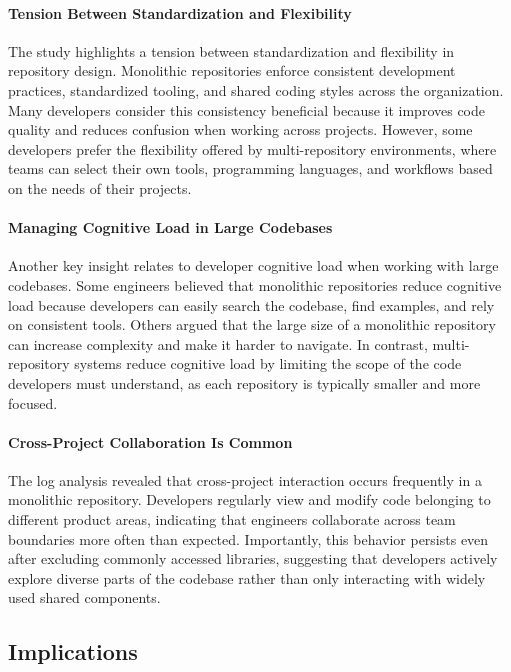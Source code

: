 \paragraph{Tension Between Standardization and Flexibility}

The study highlights a tension between standardization and flexibility in repository design. Monolithic repositories enforce consistent development practices, standardized tooling, and shared coding styles across the organization. Many developers consider this consistency beneficial because it improves code quality and reduces confusion when working across projects. However, some developers prefer the flexibility offered by multi-repository environments, where teams can select their own tools, programming languages, and workflows based on the needs of their projects.

\paragraph{Managing Cognitive Load in Large Codebases}

Another key insight relates to developer cognitive load when working with large codebases. Some engineers believed that monolithic repositories reduce cognitive load because developers can easily search the codebase, find examples, and rely on consistent tools. Others argued that the large size of a monolithic repository can increase complexity and make it harder to navigate. In contrast, multi-repository systems reduce cognitive load by limiting the scope of the code developers must understand, as each repository is typically smaller and more focused.

\paragraph{Cross-Project Collaboration Is Common}

The log analysis revealed that cross-project interaction occurs frequently in a monolithic repository. Developers regularly view and modify code belonging to different product areas, indicating that engineers collaborate across team boundaries more often than expected. Importantly, this behavior persists even after excluding commonly accessed libraries, suggesting that developers actively explore diverse parts of the codebase rather than only interacting with widely used shared components.

\subsection{Implications}
